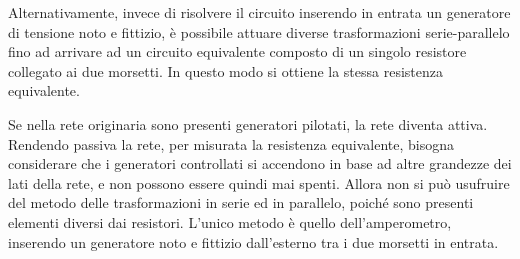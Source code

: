 \documentclass{article}
\numberwithin{equation}{subsection}
\begin{document}
Alternativamente, invece di risolvere il circuito inserendo in entrata un generatore di tensione noto e fittizio, è possibile attuare diverse trasformazioni serie-parallelo 
fino ad arrivare ad un circuito equivalente composto di un singolo resistore collegato ai due morsetti. In questo modo si ottiene la stessa resistenza equivalente.  

Se nella rete originaria sono presenti generatori pilotati, la rete diventa attiva. Rendendo passiva la rete, per misurata la resistenza equivalente, bisogna considerare 
che i generatori controllati si accendono in base ad altre grandezze dei lati della rete, e non possono essere quindi mai spenti. Allora non si può usufruire del metodo delle 
trasformazioni in serie ed in parallelo, poiché sono presenti elementi diversi dai resistori. L'unico metodo è quello dell'amperometro, inserendo un generatore noto e fittizio 
dall'esterno tra i due morsetti in entrata. 
\end{document}
